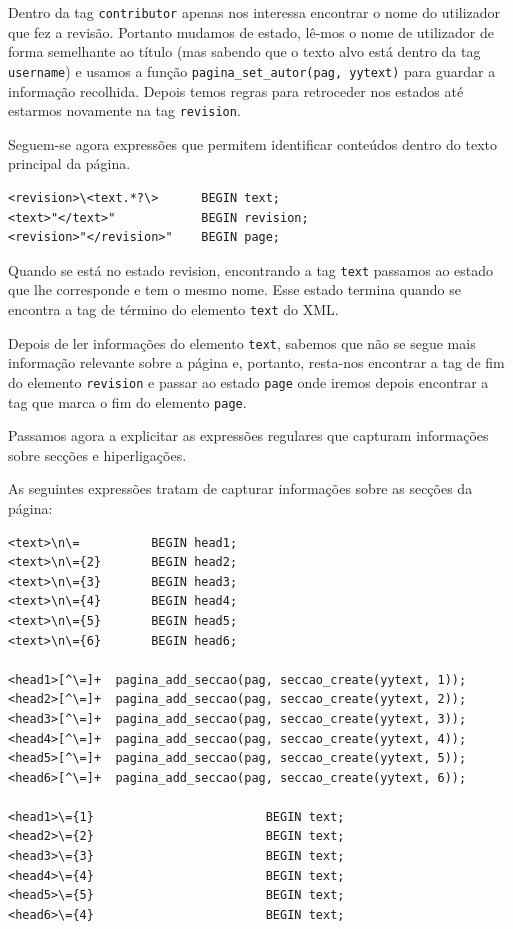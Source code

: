 \documentclass[11pt, a4paper, oneside]{article}
\begin{document}
Dentro da tag \texttt{contributor} apenas nos interessa encontrar o nome do utilizador que fez a revisão. Portanto mudamos de estado, lê-mos o nome de utilizador de forma semelhante ao título (mas sabendo que o texto alvo está dentro da tag \texttt{username}) e usamos a função \texttt{pagina\_set\_autor(pag, yytext)} para guardar a informação recolhida. Depois temos regras para retroceder nos estados até estarmos novamente na tag \texttt{revision}.


Seguem-se agora expressões que permitem identificar conteúdos dentro do texto principal da página.

\begin{verbatim}
<revision>\<text.*?\>      BEGIN text;
<text>"</text>"            BEGIN revision;
<revision>"</revision>"    BEGIN page;
\end{verbatim}

Quando se está no estado revision, encontrando a tag \texttt{text} passamos ao estado que lhe corresponde e tem o mesmo nome. Esse estado termina quando se encontra a tag de término do elemento \texttt{text} do XML.

Depois de ler informações do elemento \texttt{text}, sabemos que não se segue mais informação relevante sobre a página e, portanto, resta-nos encontrar a tag de fim do elemento \texttt{revision} e passar ao estado \texttt{page} onde iremos depois encontrar a tag que marca o fim do elemento \texttt{page}.

Passamos agora a explicitar as expressões regulares que capturam informações sobre secções e hiperligações.


As seguintes expressões tratam de capturar informações sobre as secções da página:

\begin{verbatim}
<text>\n\=          BEGIN head1;
<text>\n\={2}       BEGIN head2;
<text>\n\={3}       BEGIN head3;
<text>\n\={4}       BEGIN head4;
<text>\n\={5}       BEGIN head5;
<text>\n\={6}       BEGIN head6;

<head1>[^\=]+  pagina_add_seccao(pag, seccao_create(yytext, 1));
<head2>[^\=]+  pagina_add_seccao(pag, seccao_create(yytext, 2));
<head3>[^\=]+  pagina_add_seccao(pag, seccao_create(yytext, 3));
<head4>[^\=]+  pagina_add_seccao(pag, seccao_create(yytext, 4));
<head5>[^\=]+  pagina_add_seccao(pag, seccao_create(yytext, 5));
<head6>[^\=]+  pagina_add_seccao(pag, seccao_create(yytext, 6));

<head1>\={1}                        BEGIN text;
<head2>\={2}                        BEGIN text;
<head3>\={3}                        BEGIN text;
<head4>\={4}                        BEGIN text;
<head5>\={5}                        BEGIN text;
<head6>\={4}                        BEGIN text;
\end{verbatim}
\end{document}
